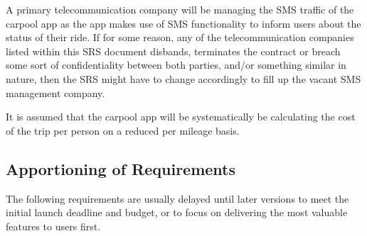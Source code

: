 \documentclass[]{article}
\begin{document}
A primary telecommunication company will be managing the SMS traffic of the carpool app as the app makes use of SMS functionality to inform users about the status of their ride. If for some reason, any of the telecommunication companies listed within this SRS document disbands, terminates the contract or breach some sort of confidentiality between both parties, and/or something similar in nature, then the SRS might have to change accordingly to fill up the vacant SMS management company.

It is assumed that the carpool app will be systematically be calculating the cost of the trip per person on a reduced per mileage basis. 

\subsection{Apportioning of Requirements}
\label{sub:apportioning_of_requirements}
The following requirements are usually delayed until later versions to meet the initial launch deadline and budget, or to focus on delivering the most valuable features to users first.
\end{document}
